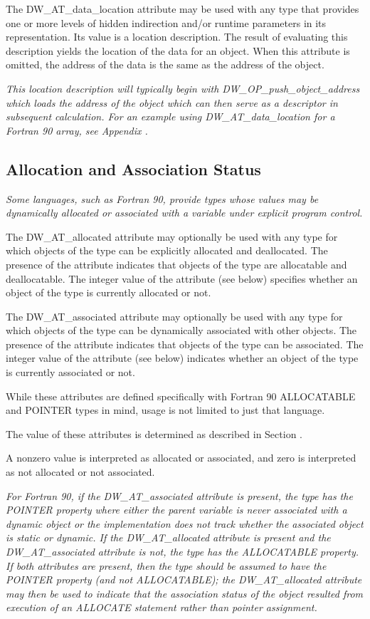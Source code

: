 The DW\_AT\_data\_location attribute may be used with any
type that provides one or more levels of hidden indirection
and/or run\dash time parameters in its representation. Its value
is a location description. The result of evaluating this
description yields the location of the data for an object.
When this attribute is omitted, the address of the data is
the same as the address of the object.

\textit{This location description will typically begin with
DW\_OP\_push\_object\_address which loads the address of the
object which can then serve as a descriptor in subsequent
calculation. For an example using DW\_AT\_data\_location for a
Fortran 90 array, see 
Appendix .}

\subsection{Allocation and Association Status}
\label{chap:allocationandassociationstatus}

\textit{Some languages, such as Fortran 90, provide types whose values
may be dynamically allocated or associated with a variable
under explicit program control.}

The DW\_AT\_allocated attribute may optionally be used with any
type for which objects of the type can be explicitly allocated
and deallocated. The presence of the attribute indicates that
objects of the type are allocatable and deallocatable. The
integer value of the attribute (see below) specifies whether
an object of the type is currently allocated or not.

The DW\_AT\_associated attribute may optionally be used with
any type for which objects of the type can be dynamically
associated with other objects. The presence of the attribute
indicates that objects of the type can be associated. The
integer value of the attribute (see below) indicates whether
an object of the type is currently associated or not.

While these attributes are defined specifically with Fortran
90 ALLOCATABLE and POINTER types in mind, usage is not limited
to just that language.

The value of these attributes is determined as described in
Section .

A non\dash zero value is interpreted as allocated or associated,
and zero is interpreted as not allocated or not associated.

\textit{For Fortran 90, if the DW\_AT\_associated attribute is present,
the type has the POINTER property where either the parent
variable is never associated with a dynamic object or the
implementation does not track whether the associated object
is static or dynamic. If the DW\_AT\_allocated attribute is
present and the DW\_AT\_associated attribute is not, the type
has the ALLOCATABLE property. If both attributes are present,
then the type should be assumed to have the POINTER property
(and not ALLOCATABLE); the DW\_AT\_allocated attribute may then
be used to indicate that the association status of the object
resulted from execution of an ALLOCATE statement rather than
pointer assignment.}

